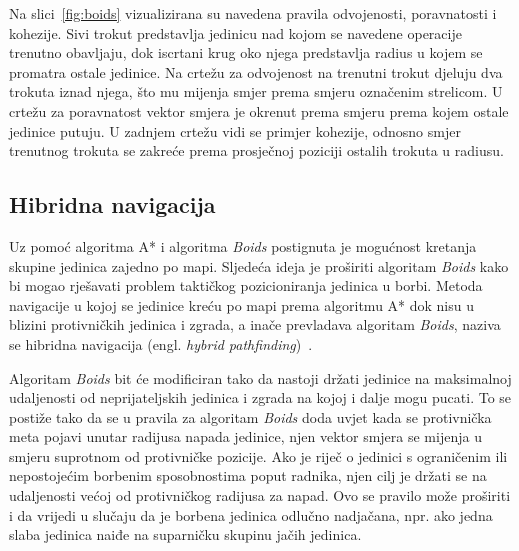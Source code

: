 \documentclass[times, utf8, zavrsni, numeric]{fer}
\begin{document}
\par Na slici~\ref{fig:boids} vizualizirana su navedena pravila odvojenosti, poravnatosti i kohezije. 
Sivi trokut predstavlja jedinicu nad kojom se navedene operacije trenutno obavljaju, dok iscrtani krug oko njega predstavlja radius u kojem se promatra ostale jedinice. 
Na crtežu za odvojenost na trenutni trokut djeluju dva trokuta iznad njega, što mu mijenja smjer prema smjeru označenim strelicom. 
U crtežu za poravnatost vektor smjera je okrenut prema smjeru prema kojem ostale jedinice putuju. 
U zadnjem crtežu vidi se primjer kohezije, odnosno smjer trenutnog trokuta se zakreće prema prosječnoj poziciji ostalih trokuta u radiusu.

\subsection{Hibridna navigacija}\label{ssec:hybrid}

\par Uz pomoć algoritma A* i algoritma \textit{Boids} postignuta je mogućnost kretanja skupine jedinica zajedno po mapi.
Sljedeća ideja je proširiti algoritam \textit{Boids} kako bi mogao rješavati problem taktičkog pozicioniranja jedinica u borbi.
Metoda navigacije u kojoj se jedinice kreću po mapi prema algoritmu A* dok nisu u blizini protivničkih jedinica i zgrada, a inače prevladava algoritam \textit{Boids}, naziva se hibridna navigacija (engl. \textit{hybrid pathfinding})~\cite{article:HybridPathdinding}.

\par Algoritam \textit{Boids} bit će modificiran tako da nastoji držati jedinice na maksimalnoj udaljenosti od neprijateljskih jedinica i zgrada na kojoj i dalje mogu pucati.
To se postiže tako da se u pravila za algoritam \textit{Boids} doda uvjet kada se protivnička meta pojavi unutar radijusa napada jedinice, njen vektor smjera se mijenja u smjeru suprotnom od protivničke pozicije.
Ako je riječ o jedinici s ograničenim ili nepostojećim borbenim sposobnostima poput radnika, njen cilj je držati se na udaljenosti većoj od protivničkog radijusa za napad.
Ovo se pravilo može proširiti i da vrijedi u slučaju da je borbena jedinica odlučno nadjačana, npr. ako jedna slaba jedinica naiđe na suparničku skupinu jačih jedinica.
\end{document}
